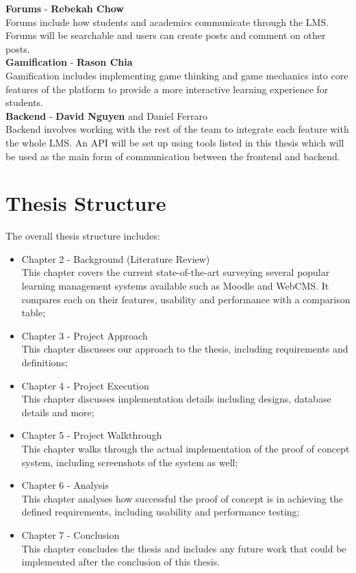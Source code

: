 \textbf{Forums} - \textbf{Rebekah Chow} \\
Forums include how students and academics communicate through the LMS. Forums will be searchable and users can create posts and comment on other posts.\\

\textbf{Gamification} - \textbf{Rason Chia} \\
Gamification includes implementing game thinking and game mechanics into core features of the platform to provide a more interactive learning experience for students.\\

\textbf{Backend} - \textbf{David Nguyen} and Daniel Ferraro \\
Backend involves working with the rest of the team to integrate each feature with the whole LMS. An API will be set up using tools listed in this thesis which will be used as the main form of communication between the frontend and backend. \\

\section{Thesis Structure}
The overall thesis structure includes:

\begin{itemize}
\item Chapter 2 - Background (Literature Review) \\
This chapter covers the current state-of-the-art surveying several popular learning management systems available such as Moodle and WebCMS. It compares each on their features, usability and performance with a comparison table;
\item Chapter 3 - Project Approach \\
This chapter discusses our approach to the thesis, including requirements and definitions;
\item Chapter 4 - Project Execution \\
This chapter discusses implementation details including designs, database details and more;
\item Chapter 5 - Project Walkthrough \\
This chapter walks through the actual implementation of the proof of concept system, including screenshots of the system as well;
\item Chapter 6 - Analysis \\
This chapter analyses how successful the proof of concept is in achieving the defined requirements, including usability and performance testing;
\item Chapter 7 - Conclusion \\
This chapter concludes the thesis and includes any future work that could be implemented after the conclusion of this thesis.
\end{itemize}